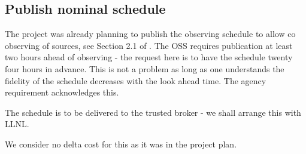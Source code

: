 \subsection{Publish nominal schedule} \label{sec:6publish}

The project was already planning to publish the observing schedule to allow co observing of sources, see Section 2.1 of .
The \gls{OSS} requires  publication at least two  hours ahead of observing - the request here is to have the schedule twenty four hours in advance.
This is not a problem as long as one understands the fidelity of the schedule decreases with the look ahead time.
The agency requirement acknowledges this.

The schedule is to be delivered to the trusted broker - we shall arrange this with \gls{LLNL}.

We consider no delta cost for this as it was in the project plan.

